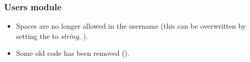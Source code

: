 \subsubsection{Users module}
\begin{itemize}
\item Spaces are no longer allowed in the username (this can be overwritten by setting the
 to \emph{string}, ).
\item Some old code has been removed ().
\end{itemize}







